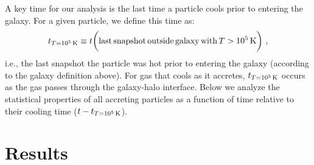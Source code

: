 \documentclass[fleqn,usenatbib]{mnras}
\newcommand{\tcon}{t_{T=10^5\,{\rm K}}}
\begin{document}
A key time for our analysis is the last time a particle cools prior to entering the galaxy. For a given particle, we define this time as:
\begin{equation}
    \tcon \equiv t \bigg( {\rm last\,snapshot\,outside\,galaxy\,with\,}T>10^5\,{\rm K} \bigg) ~,
\label{e: tcon}
\end{equation}
i.e., the last snapshot the particle was hot prior to entering the galaxy (according to the galaxy definition above). For gas that cools as it accretes, $\tcon$ occurs as the gas passes through the galaxy-halo interface. Below we analyze the statistical properties of all accreting particles as a function of time relative to their cooling time ($t-\tcon$).

\section{Results}
\label{s: results}

\label{s: characteristics}
\end{document}
